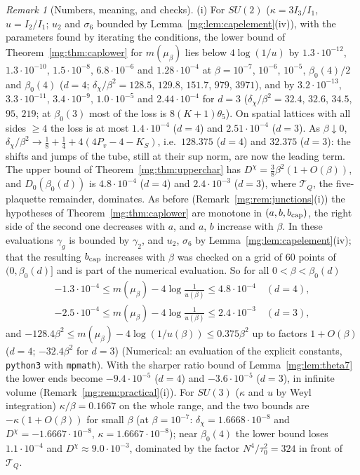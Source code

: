 \documentclass[11pt,a4paper]{article}
\theoremstyle{definition}
\theoremstyle{remark}
\newtheorem{remark}[theorem]{Remark}
\begin{document}
\begin{remark}[Numbers, meaning, and checks]\label{mg:rem:cap}
(i) For $SU(2)$ ($\kappa=3I_3/I_1$, $u=I_2/I_1$; $u_2$ and $\sigma_6$ bounded by Lemma~\ref{mg:lem:capelement}(iv)), with the parameters found by
iterating the conditions, the lower bound of Theorem~\ref{mg:thm:caplower} for $m(\mu_\beta)$ lies below $4\log(1/u)$ by $1.3\cdot10^{-12}$,
$1.3\cdot10^{-10}$, $1.5\cdot10^{-8}$, $6.8\cdot10^{-6}$ and $1.28\cdot10^{-4}$ at $\beta=10^{-7}$, $10^{-6}$, $10^{-5}$, $\beta_0(4)/2$ and $\beta_0(4)$
($d=4$; $\delta_\chi/\beta^2=128.5$, $129.8$, $151.7$, $979$, $3971$), and by $3.2\cdot10^{-13}$, $3.3\cdot10^{-11}$, $3.4\cdot10^{-9}$, $1.0\cdot10^{-5}$ and
$2.44\cdot10^{-4}$ for $d=3$ ($\delta_\chi/\beta^2=32.4$, $32.6$, $34.5$, $95$, $219$; at $\beta_0(3)$ most of the loss is $8(K+1)\theta_5$). On spatial
lattices with all sides $\ge4$ the loss is at most $1.4\cdot10^{-4}$ ($d=4$) and $2.51\cdot10^{-4}$ ($d=3$). As $\beta\downarrow0$, $\delta_\chi/\beta^2\to
\frac18+\frac14+4(4P_v-4-K_S)$, i.e.\ $128.375$ ($d=4$) and $32.375$ ($d=3$): the shifts and jumps of the tube, still at their sup norm, are now the
leading term. The upper bound of Theorem~\ref{mg:thm:upperchar} has $D^\chi=\frac38\beta^2(1+O(\beta))$, and $D_0(\beta_0(d))$ is $4.8\cdot10^{-4}$ ($d=4$)
and $2.4\cdot10^{-3}$ ($d=3$), where $\mathcal T_Q$, the five-plaquette remainder, dominates. As before (Remark~\ref{mg:rem:junctions}(i)) the hypotheses of
Theorem~\ref{mg:thm:caplower} are monotone in $(a,b,b_{\rm cap})$, the right side of the second one decreases with $a$, and $a$, $b$ increase with $\beta$.
In these evaluations $\gamma_g$ is bounded by $\gamma_2$, and $u_2$, $\sigma_6$ by Lemma~\ref{mg:lem:capelement}(iv); that the resulting $b_{\rm cap}$ increases with
$\beta$ was checked on a grid of $60$ points of $(0,\beta_0(d)]$ and is part of the numerical evaluation. So for all $0<\beta<\beta_0(d)$
\begin{gather*}
-1.3\cdot10^{-4}\le m(\mu_\beta)-4\log\frac1{u(\beta)}\le4.8\cdot10^{-4}\quad(d=4),\\
-2.5\cdot10^{-4}\le m(\mu_\beta)-4\log\frac1{u(\beta)}\le2.4\cdot10^{-3}\quad(d=3),
\end{gather*}
and $-128.4\beta^2\le m(\mu_\beta)-4\log(1/u(\beta))\le0.375\beta^2$ up to factors $1+O(\beta)$ ($d=4$; $-32.4\beta^2$ for $d=3$) (Numerical:
an evaluation of the explicit constants, \texttt{python3} with \texttt{mpmath}). With the sharper ratio bound of Lemma~\ref{mg:lem:theta7} the lower ends become
$-9.4\cdot10^{-5}$ ($d=4$) and $-3.6\cdot10^{-5}$ ($d=3$), in infinite volume (Remark~\ref{mg:rem:practical}(i)). For $SU(3)$ ($\kappa$ and $u$ by Weyl integration) $\kappa/\beta=0.1667$ on the
whole range, and the two bounds are $-\kappa(1+O(\beta))$ for small $\beta$ (at $\beta=10^{-7}$: $\delta_\chi=1.6668\cdot10^{-8}$ and $D^\chi=-1.6667\cdot10^{-8}$,
$\kappa=1.6667\cdot10^{-8}$); near $\beta_0(4)$ the lower bound loses $1.1\cdot10^{-4}$ and $D^\chi\approx9.0\cdot10^{-3}$, dominated by the factor
$N^4/\tau_0^2=324$ in front of $\mathcal T_Q$.


\end{remark}
\end{document}
